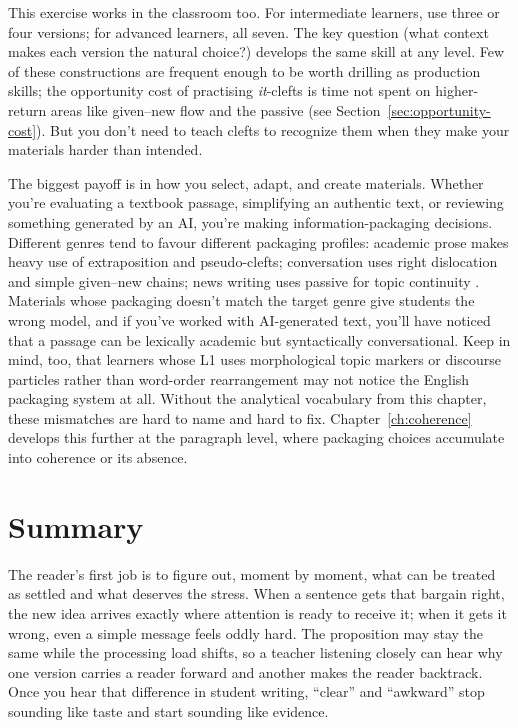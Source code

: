 This exercise works in the classroom too. For intermediate learners, use three or four versions; for advanced learners, all seven. The key question (what context makes each version the natural choice?) develops the same skill at any level. Few of these constructions are frequent enough to be worth drilling as production skills; the opportunity cost of practising \emph{it}-clefts is time not spent on higher-return areas like given--new flow and the passive (see Section~\ref{sec:opportunity-cost}). But you don't need to teach clefts to recognize them when they make your materials harder than intended.

The biggest payoff is in how you select, adapt, and create materials. Whether you're evaluating a textbook passage, simplifying an authentic text, or reviewing something generated by an AI, you're making information-packaging decisions. Different genres tend to favour different packaging profiles: academic prose makes heavy use of extraposition and pseudo-clefts; conversation uses right dislocation and simple given--new chains; news writing uses passive for topic continuity \citep[see][Chapter~11]{Biber1999}. Materials whose packaging doesn't match the target genre give students the wrong model, and if you've worked with AI-generated text, you'll have noticed that a passage can be lexically academic but syntactically conversational. Keep in mind, too, that learners whose L1 uses morphological topic markers or discourse particles rather than word-order rearrangement may not notice the English packaging system at all. Without the analytical vocabulary from this chapter, these mismatches are hard to name and hard to fix. Chapter~\ref{ch:coherence} develops this further at the paragraph level, where packaging choices accumulate into coherence or its absence.

\section{Summary}

The reader's first job is to figure out, moment by moment, what can be treated as settled and what deserves the stress. When a sentence gets that bargain right, the new idea arrives exactly where attention is ready to receive it; when it gets it wrong, even a simple message feels oddly hard. The proposition may stay the same while the processing load shifts, so a teacher listening closely can hear why one version carries a reader forward and another makes the reader backtrack. Once you hear that difference in student writing, \enquote{clear} and \enquote{awkward} stop sounding like taste and start sounding like evidence.

